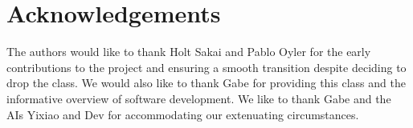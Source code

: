 \documentclass{article}
\begin{document}
\section{Acknowledgements}
The authors would like to thank Holt Sakai and Pablo Oyler for the early contributions to the project and ensuring a smooth transition despite deciding to drop the class.  We would also like to thank Gabe for providing this class and the informative overview of software development.  We like to thank Gabe and the AIs Yixiao and Dev for accommodating our extenuating circumstances.
\end{document}
